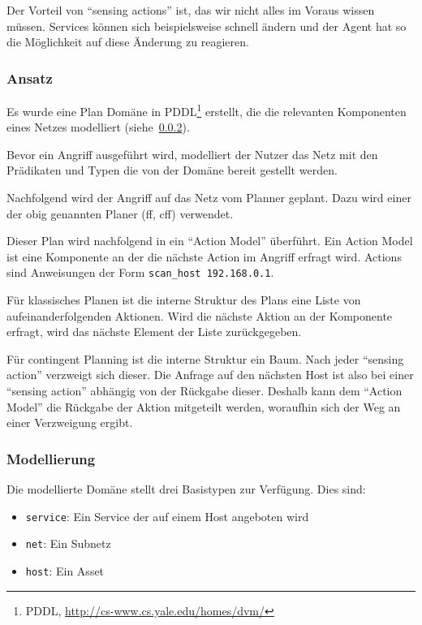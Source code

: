 Der Vorteil von \enquote{sensing actions} ist, das wir nicht alles im Voraus
wissen müssen. Services können sich beispielsweise schnell ändern und
der Agent hat so die Möglichkeit auf diese Änderung zu reagieren.


\subsubsection{Ansatz}

Es wurde eine Plan Domäne in PDDL\footnote{PDDL,
\url{http://cs-www.cs.yale.edu/homes/dvm/}} erstellt, die die relevanten
Komponenten eines Netzes modelliert (siehe~\ref{sec_model}).

Bevor ein Angriff ausgeführt wird, modelliert der Nutzer das Netz mit
den Prädikaten und Typen die von der Domäne bereit gestellt werden.

Nachfolgend wird der Angriff auf das Netz vom Planner geplant. Dazu
wird einer der obig genannten Planer (ff, cff) verwendet.

Dieser Plan wird nachfolgend in ein \enquote{Action Model} überführt. Ein
Action Model ist eine Komponente an der die nächste Action im Angriff
erfragt wird. Actions sind Anweisungen der Form \texttt{scan\_host 192.168.0.1}.

Für klassisches Planen ist die interne Struktur des Plans eine Liste
von aufeinanderfolgenden Aktionen. Wird die nächste Aktion an der
Komponente erfragt, wird das nächste Element der Liste zurückgegeben.

Für contingent Planning ist die interne Struktur ein Baum. Nach jeder
\enquote{sensing action} verzweigt sich dieser. Die Anfrage auf den nächsten
Host ist also bei einer \enquote{sensing action} abhängig von der Rückgabe
dieser. Deshalb kann dem \enquote{Action Model} die Rückgabe der Aktion
mitgeteilt werden, woraufhin sich der Weg an einer Verzweigung ergibt.

		
\subsubsection{Modellierung}
\label{sec_model}

Die modellierte Domäne stellt drei Basistypen zur Verfügung. Dies sind:
		     
\begin{itemize}
  \item \texttt{service}: Ein Service der auf einem Host angeboten wird
  \item \texttt{net}: Ein Subnetz
  \item \texttt{host}: Ein Asset
\end{itemize}

